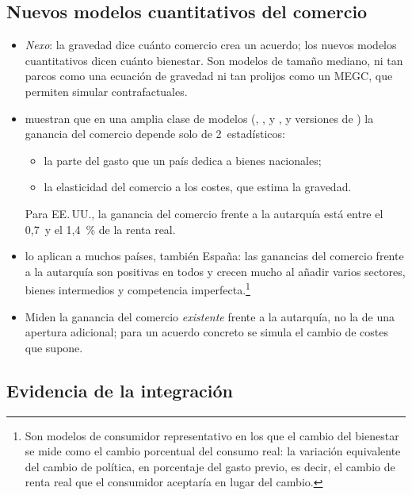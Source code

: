 \documentclass[11pt]{article}
\begin{document}
\subsection{Nuevos modelos cuantitativos del comercio}\label{sec:nqtm}

\begin{itemize}
\item \emph{Nexo}: la gravedad dice cuánto comercio crea un acuerdo; los nuevos modelos cuantitativos dicen cuánto bienestar. Son modelos de tamaño mediano, ni tan parcos como una ecuación de gravedad ni tan prolijos como un MEGC, que permiten simular contrafactuales.
\item \textcite{ArkolakisCostinotRodriguezClare2012New} muestran que en una amplia clase de modelos (, ,  y , y versiones de ) la ganancia del comercio depende solo de 2~estadísticos:
  \begin{itemize}
  \item la parte del gasto que un país dedica a bienes nacionales;
  \item la elasticidad del comercio a los costes, que estima la gravedad.
  \end{itemize}
  Para EE.\,UU., la ganancia del comercio frente a la autarquía está entre el 0,7~y el 1,4~\% de la renta real.
\item \textcite{CostinotRodriguezClare2014Trade} lo aplican a muchos países, también España: las ganancias del comercio frente a la autarquía son positivas en todos y crecen mucho al añadir varios sectores, bienes intermedios y competencia imperfecta.\footnote{Son modelos de consumidor representativo en los que el cambio del bienestar se mide como el cambio porcentual del consumo real: la variación equivalente del cambio de política, en porcentaje del gasto previo, es decir, el cambio de renta real que el consumidor aceptaría en lugar del cambio.}
\item Miden la ganancia del comercio \emph{existente} frente a la autarquía, no la de una apertura adicional; para un acuerdo concreto se simula el cambio de costes que supone.
\end{itemize}

\subsection{Evidencia de la integración}\label{sec:evidencia}
\end{document}
